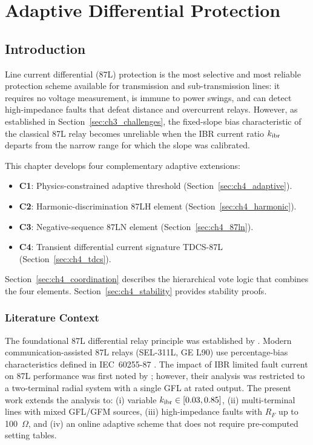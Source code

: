 \chapter{Adaptive Differential Protection}
\label{ch:differential}
\label{ch:line_diff}
\label{ch:transformer_diff}

\section{Introduction}
\label{sec:ch4_intro}

Line current differential (87L) protection is the most selective and most
reliable protection scheme available for transmission and sub-transmission
lines: it requires no voltage measurement, is immune to power swings, and
can detect high-impedance faults that defeat distance and overcurrent relays.
However, as established in Section~\ref{sec:ch3_challenges}, the fixed-slope bias
characteristic of the classical 87L relay becomes unreliable when the IBR
current ratio $k_\mathrm{ibr}$ departs from the narrow range for which the slope
was calibrated.

This chapter develops four complementary adaptive extensions:
\begin{itemize}
\item \textbf{C1}: Physics-constrained adaptive threshold (Section~\ref{sec:ch4_adaptive}).
\item \textbf{C2}: Harmonic-discrimination 87LH element (Section~\ref{sec:ch4_harmonic}).
\item \textbf{C3}: Negative-sequence 87LN element (Section~\ref{sec:ch4_87ln}).
\item \textbf{C4}: Transient differential current signature TDCS-87L
      (Section~\ref{sec:ch4_tdcs}).
\end{itemize}

Section~\ref{sec:ch4_coordination} describes the hierarchical vote logic
that combines the four elements. Section~\ref{sec:ch4_stability} provides
stability proofs.

\subsection{Literature Context}

The foundational 87L differential relay principle was established by
\citet{Westinghouse1962}. Modern communication-assisted 87L relays
(SEL-311L, GE L90) use percentage-bias characteristics defined in
IEC~60255-87 \citep{IEC60255}. The impact of IBR limited fault current on
87L performance was first noted by \citet{Hooshyar2019}; however, their
analysis was restricted to a two-terminal radial system with a single GFL
at rated output. The present work extends the analysis to:
(i) variable $k_\mathrm{ibr} \in [0.03, 0.85]$,
(ii) multi-terminal lines with mixed GFL/GFM sources,
(iii) high-impedance faults with $R_F$ up to 100~$\Omega$, and
(iv) an online adaptive scheme that does not require pre-computed setting
tables.

